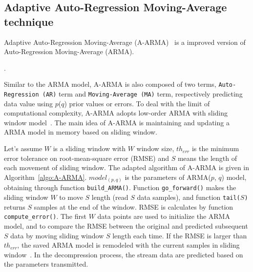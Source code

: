 \subsection{Adaptive Auto-Regression Moving-Average technique}


Adaptive Auto-Regression Moving-Average (A-ARMA)~\cite{lu2010optimized} is a
improved version of Auto-Regression Moving-Average (ARMA).

.

Similar to the ARMA model, A-ARMA is also composed of
two terms, \texttt{Auto-Regression (AR)} term and \texttt{Moving-Average (MA)}
term, respectively predicting data value using $p$($q$) prior values or errors. 
To deal with the limit of computational complexity, A-ARMA adopts low-order ARMA
with sliding window model~\cite{lu2010optimized}. The main idea of A-ARMA is
maintaining and updating a ARMA model in memory based on sliding window. 

Let's assume $W$ is a sliding window with $W$ window size, $th_{err}$ is the
minimum error tolerance on root-mean-square error (RMSE) and $S$ means the
length of each movement of sliding window. The adapted algorithm of A-ARMA is
given in Algorithm~\ref{algo:A-ARMA}. $model_{(p, q)}$ is the parameters of
ARMA($p$, $q$) model, obtaining through function \texttt{build_ARMA()}. Function
\texttt{go_forward()} makes the sliding window $W$ to move $S$ length (read $S$
data samples), and function \texttt{tail($S$)} returns $S$ samples at the end of
the window. RMSE is calculates by function \texttt{compute_error()}. The first
$W$ data points are used to initialize the ARMA model, and to compare the RMSE
between the original and predicted subsequent $S$ data by moving sliding window
$S$ length each time. If the RMSE is larger than $th_{err}$, the saved ARMA
model is remodeled with the current samples in sliding
window~\cite{lu2010optimized}. In the decompression process, the stream data are
predicted based on the parameters transmitted.

